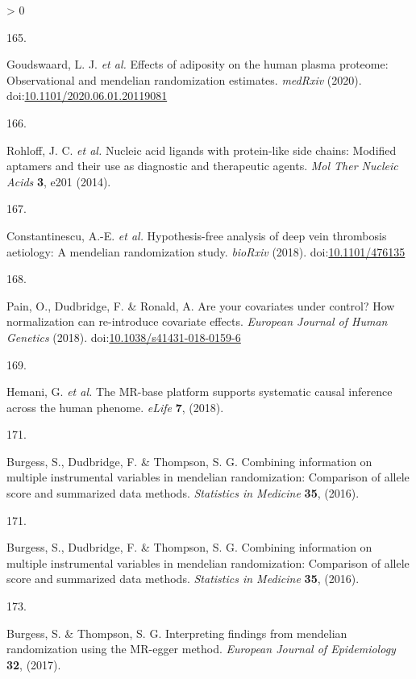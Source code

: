\documentclass[11pt,twoside]{bristolthesis}
\newlength{\cslhangindent}
\newlength{\csllabelwidth}
\newenvironment{CSLReferences}[2] %
 {%
  \setlength{\parindent}{0pt}
  \ifodd #1 \everypar{\setlength{\hangindent}{\cslhangindent}}\ignorespaces\fi
  \ifnum #2 > 0
  \setlength{\parskip}{#2\baselineskip}
  \fi
 }%
 {}
\newcommand{\CSLLeftMargin}[1]{\parbox[t]{\csllabelwidth}{#1}}
\newcommand{\CSLRightInline}[1]{\parbox[t]{\linewidth - \csllabelwidth}{#1}\break}
\begin{document}
\begin{CSLReferences}{0}{0}
\leavevmode\hypertarget{ref-Goudswaard2020}{}%
\CSLLeftMargin{165. }
\CSLRightInline{Goudswaard, L. J. \emph{et al.} Effects of adiposity on the human plasma proteome: Observational and mendelian randomization estimates. \emph{medRxiv} (2020). doi:\href{https://doi.org/10.1101/2020.06.01.20119081}{10.1101/2020.06.01.20119081}}

\leavevmode\hypertarget{ref-Rohloff2014}{}%
\CSLLeftMargin{166. }
\CSLRightInline{Rohloff, J. C. \emph{et al.} Nucleic acid ligands with protein-like side chains: Modified aptamers and their use as diagnostic and therapeutic agents. \emph{Mol Ther Nucleic Acids} \textbf{3}, e201 (2014).}

\leavevmode\hypertarget{ref-Constantinescu2018}{}%
\CSLLeftMargin{167. }
\CSLRightInline{Constantinescu, A.-E. \emph{et al.} Hypothesis-free analysis of deep vein thrombosis aetiology: A mendelian randomization study. \emph{bioRxiv} (2018). doi:\href{https://doi.org/10.1101/476135}{10.1101/476135}}

\leavevmode\hypertarget{ref-Pain2018}{}%
\CSLLeftMargin{168. }
\CSLRightInline{Pain, O., Dudbridge, F. \& Ronald, A. Are your covariates under control? How normalization can re-introduce covariate effects. \emph{European Journal of Human Genetics} (2018). doi:\href{https://doi.org/10.1038/s41431-018-0159-6}{10.1038/s41431-018-0159-6}}

\leavevmode\hypertarget{ref-Hemani2018}{}%
\CSLLeftMargin{169. }
\CSLRightInline{Hemani, G. \emph{et al.} The MR-base platform supports systematic causal inference across the human phenome. \emph{eLife} \textbf{7}, (2018).}

\leavevmode\hypertarget{ref-Burgess2016}{}%
\CSLLeftMargin{171. }
\CSLRightInline{Burgess, S., Dudbridge, F. \& Thompson, S. G. Combining information on multiple instrumental variables in mendelian randomization: Comparison of allele score and summarized data methods. \emph{Statistics in Medicine} \textbf{35}, (2016).}

\leavevmode\hypertarget{ref-Burgess2016}{}%
\CSLLeftMargin{171. }
\CSLRightInline{Burgess, S., Dudbridge, F. \& Thompson, S. G. Combining information on multiple instrumental variables in mendelian randomization: Comparison of allele score and summarized data methods. \emph{Statistics in Medicine} \textbf{35}, (2016).}

\leavevmode\hypertarget{ref-Burgess2017}{}%
\CSLLeftMargin{173. }
\CSLRightInline{Burgess, S. \& Thompson, S. G. Interpreting findings from mendelian randomization using the MR-egger method. \emph{European Journal of Epidemiology} \textbf{32}, (2017).}


\end{CSLReferences}
\end{document}

